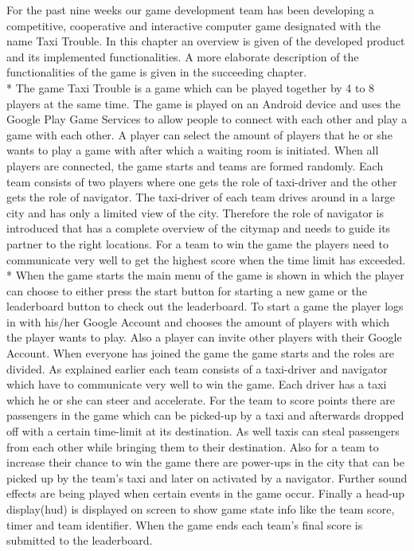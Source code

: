 For the past nine weeks our game development team has been developing a competitive, cooperative and interactive computer game designated with the name Taxi Trouble. In this chapter an overview is given of the developed product and its implemented functionalities. A more elaborate description of the functionalities of the game is given in the succeeding chapter.
\\*
The game Taxi Trouble is a game which can be played together by 4 to 8 players at the same time. The game is played on an Android device and uses the Google Play Game Services to allow people to connect with each other and play a game with each other. A player can select the amount of players that he or she wants to play a game with after which a waiting room is initiated. When all players are connected, the game starts and teams are formed randomly. Each team consists of two players where one gets the role of taxi-driver and the other gets the role of navigator. The taxi-driver of each team drives around in a large city and has only a limited view of the city. Therefore the role of navigator is introduced that has a complete overview of the citymap and needs to guide its partner to the right locations. For a team to win the game the players need to communicate very well to get the highest score when the time limit has exceeded.
\\*
When the game starts the main menu of the game is shown in which the player can choose to either press the start button for starting a new game or the leaderboard button to check out the leaderboard.
To start a game the player logs in with his/her Google Account and chooses the amount of players with which the player wants to play. Also a player can invite other players with their Google Account. When everyone has joined the game the game starts and the roles are divided.
As explained earlier each team consists of a taxi-driver and navigator which have to communicate very well to win the game. Each driver has a taxi which he or she can steer and accelerate. For the team to score points there are passengers in the game which can be picked-up by a taxi and afterwards dropped off with a certain time-limit at its destination. As well taxis can steal passengers from each other while bringing them to their destination. Also for a team to increase their chance to win the game there are power-ups in the city that can be picked up by the team's taxi and later on activated by a navigator. Further sound effects are being played when certain events in the game occur. Finally a head-up display(hud) is displayed on screen to show game state info like the team score, timer and team identifier. When the game ends each team's final score is submitted to the leaderboard.